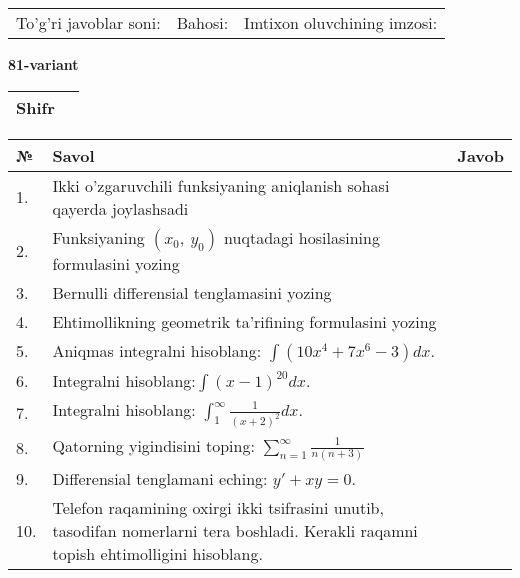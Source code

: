 \documentclass{article}
\begin{document}
  \vspace{1cm}
  
  \begin{tabular}{lll}
  To'g'ri javoblar soni: \underline{\hspace{1.5cm}} & 
  Bahosi: \underline{\hspace{1.5cm}} & 
  Imtixon oluvchining imzosi: \underline{\hspace{2cm}} \\
  \end{tabular}
  
  \egroup
  
  \newpage
  
  
  \textbf{81-variant}\\
  
  \bgroup
  \def\arraystretch{1.6} %
  
  \begin{tabular}{|m{5.7cm}|m{9.5cm}|}
  \hline
  Shifr & \\
  \hline
  \end{tabular}
  
  \vspace{1cm}
  
  \begin{tabular}{|m{0.7cm}|m{10cm}|m{4cm}|}
  \hline
  № & Savol & Javob \\
  \hline
  1. & Ikki o'zgaruvchili funksiyaning aniqlanish sohasi qayerda joylashsadi &  \\
  \hline
  2. & Funksiyaning \((x_{0},\ y_{0})\) nuqtadagi hosilasining formulasini yozing &  \\
  \hline
  3. & Bernulli differensial tenglamasini yozing &  \\
  \hline
  4. & Ehtimollikning geometrik ta'rifining formulasini yozing &  \\
  \hline
  5. & Aniqmas integralni hisoblang: \(\int {\left( 10x^{4} + 7x^{6} - 3 \right)dx}\). &  \\
  \hline
  6. & Integralni hisoblang:\(\int {(x - 1)^{20}}dx\). &  \\
  \hline
  7. & Integralni hisoblang: \(\int_{1}^{\infty}{\frac{1}{(x + 2)^{2}}dx}\). &  \\
  \hline
  8. & Qatorning yigindisini toping: \(\sum_{n = 1}^{\infty}\frac{1}{n(n + 3)}\) &  \\
  \hline
  9. & Differensial tenglamani eching: \(y' + xy = 0\). &  \\
  \hline
  10. & Telefon raqamining oxirgi ikki tsifrasini unutib, tasodifan nomerlarni tera boshladi. Kerakli raqamni topish ehtimolligini hisoblang. &  \\
  \hline
  \end{tabular}
  
\end{document}
